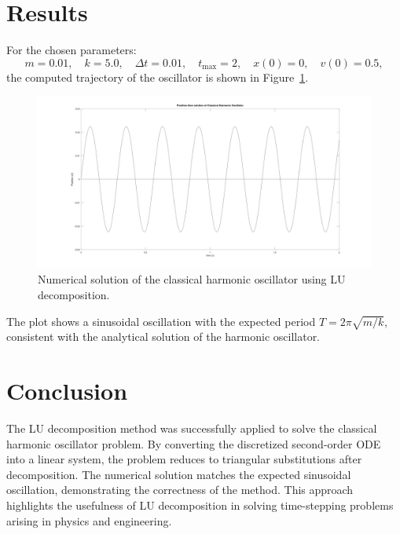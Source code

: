 \section*{Results}
For the chosen parameters:
\[
  m = 0.01, \quad k = 5.0, \quad \Delta t = 0.01, \quad t_{\max} = 2, \quad x(0) = 0, \quad v(0) = 0.5,
\]
the computed trajectory of the oscillator is shown in Figure~\ref{fig:a2}.

\begin{figure}[h!]
  \centering
  \includegraphics[width=1.0\textwidth]{a2.jpg}
  \caption{Numerical solution of the classical harmonic oscillator using LU decomposition.}
  \label{fig:a2}
\end{figure}

The plot shows a sinusoidal oscillation with the expected period $T = 2\pi \sqrt{m/k}$, consistent with the analytical solution of the harmonic oscillator.

\section*{Conclusion}
The LU decomposition method was successfully applied to solve the classical harmonic oscillator problem. By converting the discretized second-order ODE into a linear system, the problem reduces to triangular substitutions after decomposition. The numerical solution matches the expected sinusoidal oscillation, demonstrating the correctness of the method. This approach highlights the usefulness of LU decomposition in solving time-stepping problems arising in physics and engineering.

